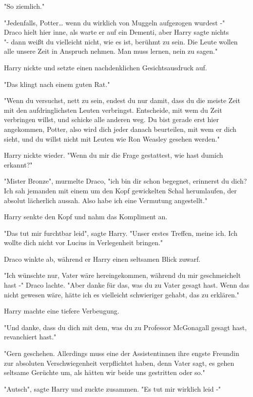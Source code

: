 {"So ziemlich."

"Jedenfalls, Potter… wenn du wirklich von Muggeln aufgezogen wurdest -"\\ Draco hielt hier inne, als warte er auf ein Dementi, aber Harry sagte nichts\\ "- dann weißt du vielleicht nicht, wie es ist, berühmt zu sein. Die Leute wollen alle unsere Zeit in Anspruch nehmen. Man muss lernen, nein zu sagen."

Harry nickte und setzte einen nachdenklichen Gesichtsausdruck auf.

"Das klingt nach einem guten Rat."

"Wenn du versuchst, nett zu sein, endest du nur damit, dass du die meiste Zeit mit den aufdringlichsten Leuten verbringst. Entscheide, mit wem du Zeit verbringen willst, und schicke alle anderen weg. Du bist gerade erst hier angekommen, Potter, also wird dich jeder danach beurteilen, mit wem er dich sieht, und du willst nicht mit Leuten wie Ron Weasley gesehen werden."

Harry nickte wieder. "Wenn du mir die Frage gestattest, wie hast dumich erkannt?"

"Mister Bronze", murmelte Draco, "ich bin dir schon begegnet, erinnerst du dich? Ich sah jemanden mit einem um den Kopf gewickelten Schal herumlaufen, der absolut lächerlich aussah. Also habe ich eine Vermutung angestellt."

Harry senkte den Kopf und nahm das Kompliment an.

"Das tut mir furchtbar leid", sagte Harry. "Unser erstes Treffen, meine ich. Ich wollte dich nicht vor Lucius in Verlegenheit bringen."

Draco winkte ab, während er Harry einen seltsamen Blick zuwarf.

"Ich wünschte nur, Vater wäre hereingekommen, während du mir geschmeichelt hast -" Draco lachte. "Aber danke für das, was du zu Vater gesagt hast. Wenn das nicht gewesen wäre, hätte ich es vielleicht schwieriger gehabt, das zu erklären."

Harry machte eine tiefere Verbeugung.

"Und danke, dass du dich mit dem, was du zu Professor McGonagall gesagt hast, revanchiert hast."

"Gern geschehen. Allerdings muss eine der Assistentinnen ihre engste Freundin zur absoluten Verschwiegenheit verpflichtet haben, denn Vater sagt, es gehen seltsame Gerüchte um, als hätten wir beide uns gestritten oder so."

"Autsch", sagte Harry und zuckte zusammen. "Es tut mir wirklich leid -"

}
